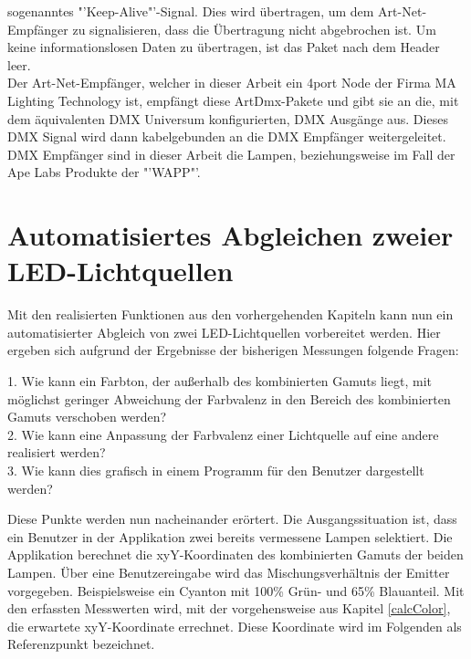 \documentclass[11pt]{scrartcl}
\begin{document}
sogenanntes "'Keep-Alive"'-Signal. Dies wird übertragen, um dem Art-Net-Empfänger zu signalisieren, dass die Übertragung nicht abgebrochen ist. Um keine
informationslosen Daten zu übertragen, ist das Paket nach dem Header leer.\\
Der Art-Net-Empfänger, welcher in dieser Arbeit ein 4port Node der Firma MA Lighting Technology ist, empfängt diese ArtDmx-Pakete und gibt sie an die, mit dem
äquivalenten DMX Universum konfigurierten, DMX Ausgänge aus. Dieses DMX Signal wird dann kabelgebunden an die DMX Empfänger weitergeleitet.\\
DMX Empfänger sind in dieser Arbeit die Lampen, beziehungsweise im Fall der Ape Labs Produkte der "'WAPP"'.
\clearpage

\section{Automatisiertes Abgleichen zweier LED-Lichtquellen} \label{comparing}
Mit den realisierten Funktionen aus den vorhergehenden Kapiteln kann nun ein automatisierter Abgleich von zwei LED-Lichtquellen vorbereitet werden. Hier
ergeben sich aufgrund der Ergebnisse der bisherigen Messungen folgende Fragen:\\
\begin{addmargin}[2em]{0em}
    1. Wie kann ein Farbton, der außerhalb des kombinierten Gamuts liegt, mit möglichst geringer Abweichung der Farbvalenz in den Bereich des kombinierten Gamuts
    verschoben werden?\\
    2. Wie kann eine Anpassung der Farbvalenz einer Lichtquelle auf eine andere realisiert werden?\\
    3. Wie kann dies grafisch in einem Programm für den Benutzer dargestellt werden?\\
\end{addmargin}
Diese Punkte werden nun nacheinander erörtert. Die Ausgangssituation ist, dass ein Benutzer in der Applikation zwei bereits vermessene Lampen selektiert. Die
Applikation berechnet die xyY-Koordinaten des kombinierten Gamuts der beiden Lampen. Über eine Benutzereingabe wird das Mischungsverhältnis der Emitter vorgegeben.
Beispielsweise ein Cyanton mit 100\% Grün- und 65\% Blauanteil. Mit den erfassten Messwerten wird, mit der vorgehensweise aus Kapitel \ref{calcColor}, die erwartete
xyY-Koordinate errechnet. Diese Koordinate wird im Folgenden als Referenzpunkt bezeichnet.
\end{document}
